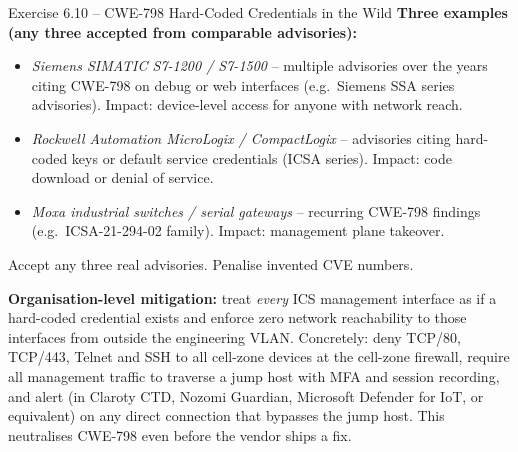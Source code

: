 \documentclass[11pt,a4paper]{article}
\begin{document}
\begin{taskbox}{Exercise 6.10 -- CWE-798 Hard-Coded Credentials in the Wild}
\textbf{Three examples (any three accepted from comparable
advisories):}
\begin{itemize}
  \item \emph{Siemens SIMATIC S7-1200 / S7-1500} -- multiple
        advisories over the years citing CWE-798 on debug or web
        interfaces (e.g.\ Siemens SSA series advisories). Impact:
        device-level access for anyone with network reach.
  \item \emph{Rockwell Automation MicroLogix / CompactLogix} --
        advisories citing hard-coded keys or default service
        credentials (ICSA series). Impact: code download or denial
        of service.
  \item \emph{Moxa industrial switches / serial gateways} --
        recurring CWE-798 findings (e.g.\ ICSA-21-294-02 family).
        Impact: management plane takeover.
\end{itemize}
Accept any three real advisories. Penalise invented CVE numbers.

\textbf{Organisation-level mitigation:} treat \emph{every} ICS
management interface as if a hard-coded credential exists and
enforce zero network reachability to those interfaces from outside
the engineering VLAN. Concretely: deny TCP/80, TCP/443, Telnet and
SSH to all cell-zone devices at the cell-zone firewall, require all
management traffic to traverse a jump host with MFA and session
recording, and alert (in Claroty CTD, Nozomi Guardian, Microsoft
Defender for IoT, or equivalent) on any direct connection that
bypasses the jump host. This neutralises CWE-798 even before the
vendor ships a fix.
\end{taskbox}
\end{document}
